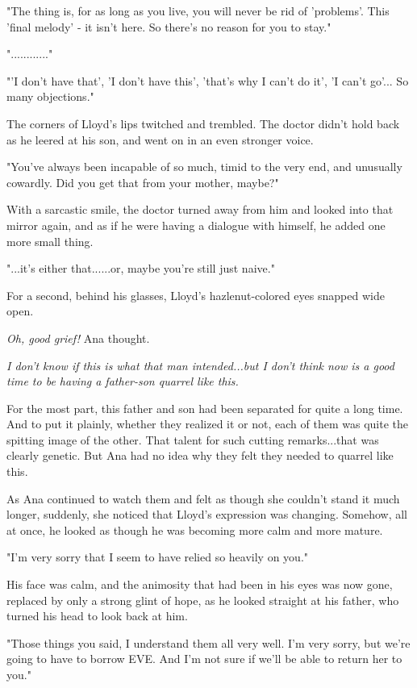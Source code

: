 \documentclass[
]{article}
\begin{document}
"The thing is, for as long as you live, you will never be rid of
'problems'. This 'final melody' - it isn't here. So there's no reason
for you to stay."

"............"

"'I don't have that', 'I don't have this', 'that's why I can't do it',
'I can't go'... So many objections."

The corners of Lloyd's lips twitched and trembled. The doctor didn't
hold back as he leered at his son, and went on in an even stronger
voice.

"You've always been incapable of so much, timid to the very end, and
unusually cowardly. Did you get that from your mother, maybe?"

With a sarcastic smile, the doctor turned away from him and looked into
that mirror again, and as if he were having a dialogue with himself, he
added one more small thing.

"...it's either that......or, maybe you're still just naive."

For a second, behind his glasses, Lloyd's hazlenut-colored eyes snapped
wide open.

\emph{Oh, good grief!} Ana thought.

\emph{I don't know if this is what that man intended...but I don't think
now is a good time to be having a father-son quarrel like this.}

For the most part, this father and son had been separated for quite a
long time. And to put it plainly, whether they realized it or not, each
of them was quite the spitting image of the other. That talent for such
cutting remarks...that was clearly genetic. But Ana had no idea why they
felt they needed to quarrel like this.

As Ana continued to watch them and felt as though she couldn't stand it
much longer, suddenly, she noticed that Lloyd's expression was changing.
Somehow, all at once, he looked as though he was becoming more calm and
more mature.

"I'm very sorry that I seem to have relied so heavily on you."

His face was calm, and the animosity that had been in his eyes was now
gone, replaced by only a strong glint of hope, as he looked straight at
his father, who turned his head to look back at him.

"Those things you said, I understand them all very well. I'm very sorry,
but we're going to have to borrow EVE. And I'm not sure if we'll be able
to return her to you."
\end{document}
